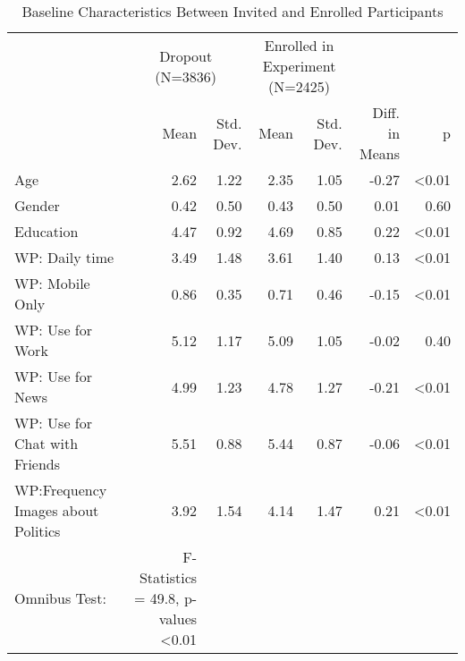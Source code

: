 \begin{table}

\caption{Baseline Characteristics Between Invited and Enrolled Participants}
\centering
\begin{tabular}[t]{lrrrrrr}
\toprule
\multicolumn{1}{c}{ } & \multicolumn{2}{c}{Dropout (N=3836)} & \multicolumn{2}{c}{Enrolled in Experiment (N=2425)} & \multicolumn{2}{c}{ } \\
\cmidrule(l{3pt}r{3pt}){2-3} \cmidrule(l{3pt}r{3pt}){4-5}
  & Mean & Std. Dev. & Mean & Std. Dev. & Diff. in Means & p\\
\midrule
Age & 2.62 & 1.22 & 2.35 & 1.05 & -0.27 & <0.01\\
Gender & 0.42 & 0.50 & 0.43 & 0.50 & 0.01 & 0.60\\
Education & 4.47 & 0.92 & 4.69 & 0.85 & 0.22 & <0.01\\
WP: Daily time & 3.49 & 1.48 & 3.61 & 1.40 & 0.13 & <0.01\\
WP: Mobile Only & 0.86 & 0.35 & 0.71 & 0.46 & -0.15 & <0.01\\
WP: Use for Work & 5.12 & 1.17 & 5.09 & 1.05 & -0.02 & 0.40\\
WP: Use for News & 4.99 & 1.23 & 4.78 & 1.27 & -0.21 & <0.01\\
WP: Use for Chat with Friends & 5.51 & 0.88 & 5.44 & 0.87 & -0.06 & <0.01\\
WP:Frequency Images about Politics & 3.92 & 1.54 & 4.14 & 1.47 & 0.21 & <0.01\\
Omnibus Test: & F-Statistics = 49.8, p-values <0.01 &  &  &  &  & \\
\bottomrule
\end{tabular}
\end{table}
